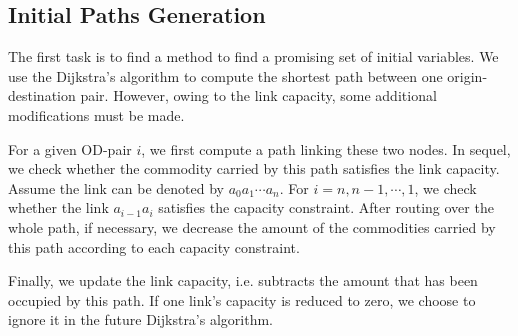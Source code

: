 

\subsection{Initial Paths Generation}
The first task is to find a method to find a promising set of
initial variables. We use the Dijkstra’s algorithm to compute the shortest path between one origin-destination pair. However, owing to the link capacity, some additional modifications must be made.

For a given OD-pair $i$, we first compute a path linking these two nodes. In sequel, we check whether the commodity carried by this path satisfies the link capacity. Assume the link can be denoted by $a_0a_1\cdots a_n$. For $i=n,n-1,\cdots,1$, we check whether the link $a_{i-1}a_i$ satisfies the capacity constraint. After routing over the whole path, if necessary, we decrease the amount of the commodities carried by this path according to each capacity constraint. 

Finally, we update the link capacity, i.e. subtracts the amount that has been occupied by this path. If one link's capacity is reduced to zero, we choose to ignore it in the future Dijkstra's algorithm. 

